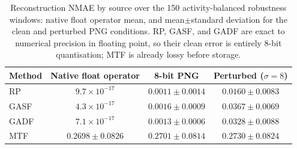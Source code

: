 \documentclass[10pt,a4paper,parskip=half-]{scrartcl}
\begin{document}
\begin{table}[H]
\centering
\caption{Reconstruction NMAE by source over the 150 activity-balanced robustness windows: native float operator mean, and mean$\pm$standard deviation for the clean and perturbed PNG conditions. RP, GASF, and GADF are exact to numerical precision in floating point, so their clean error is entirely 8-bit quantisation; MTF is already lossy before storage.}
\label{tab:error_sources}
\begin{tabular}{lccc}
\toprule
Method & Native float operator & 8-bit PNG & Perturbed ($\sigma=8$) \\
\midrule
RP   & $9.7\times10^{-17}$ & $0.0011\pm0.0014$ & $0.0160\pm0.0083$ \\
GASF & $4.3\times10^{-17}$ & $0.0016\pm0.0009$ & $0.0367\pm0.0069$ \\
GADF & $7.1\times10^{-17}$ & $0.0013\pm0.0006$ & $0.0328\pm0.0088$ \\
MTF  & $0.2698\pm0.0826$   & $0.2701\pm0.0814$ & $0.2730\pm0.0824$ \\
\bottomrule
\end{tabular}
\end{table}
\end{document}
